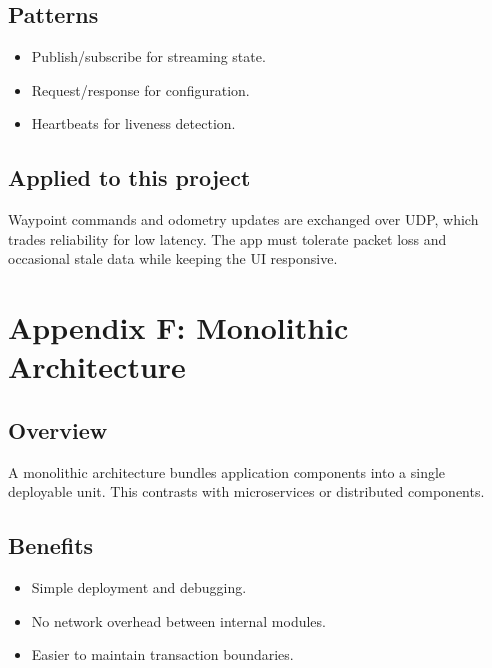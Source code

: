 \documentclass[letterpaper,10pt,english]{sphinxmanual}
\begin{document}
\section{Patterns}
\label{\detokenize{appendix_e_distributed_systems:patterns}}\begin{itemize}
\item {} 
\sphinxAtStartPar
Publish/subscribe for streaming state.

\item {} 
\sphinxAtStartPar
Request/response for configuration.

\item {} 
\sphinxAtStartPar
Heartbeats for liveness detection.

\end{itemize}


\section{Applied to this project}
\label{\detokenize{appendix_e_distributed_systems:applied-to-this-project}}
\sphinxAtStartPar
Waypoint commands and odometry updates are exchanged over UDP, which trades
reliability for low latency. The app must tolerate packet loss and occasional
stale data while keeping the UI responsive.


\chapter{Appendix F: Monolithic Architecture}
\label{\detokenize{appendix_f_monolithic_architecture:appendix-f-monolithic-architecture}}\label{\detokenize{appendix_f_monolithic_architecture::doc}}

\section{Overview}
\label{\detokenize{appendix_f_monolithic_architecture:overview}}
\sphinxAtStartPar
A monolithic architecture bundles application components into a single deployable
unit. This contrasts with microservices or distributed components.


\section{Benefits}
\label{\detokenize{appendix_f_monolithic_architecture:benefits}}\begin{itemize}
\item {} 
\sphinxAtStartPar
Simple deployment and debugging.

\item {} 
\sphinxAtStartPar
No network overhead between internal modules.

\item {} 
\sphinxAtStartPar
Easier to maintain transaction boundaries.

\end{itemize}
\end{document}
